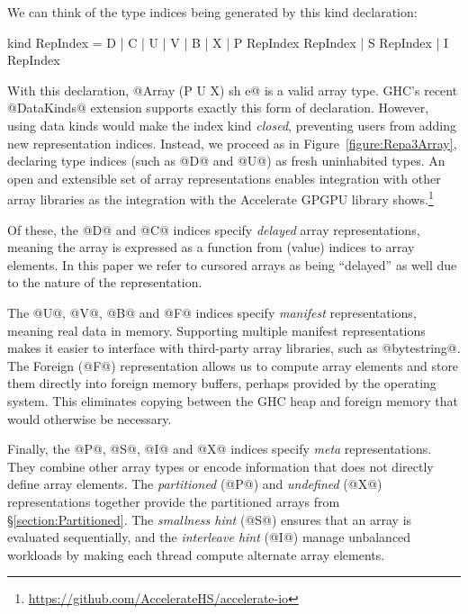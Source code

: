 We can think of the type indices being generated by this kind declaration:
\begin{small}
\begin{code}
  kind RepIndex = D | C | U | V | B | X
                | P RepIndex RepIndex
                | S RepIndex | I RepIndex
\end{code}
\end{small}
With this declaration, @Array (P U X) sh e@ is a valid array type. GHC's recent @DataKinds@ extension supports exactly this form of declaration. However, using data kinds would make the index kind \emph{closed}, preventing users from adding new representation indices. Instead, we proceed as in Figure~\ref{figure:Repa3Array}, declaring type indices (such as @D@ and @U@) as fresh uninhabited types. An open and extensible set of array representations enables integration with other array libraries as the integration with the Accelerate GPGPU library shows.\footnote{\url{https://github.com/AccelerateHS/accelerate-io}}

Of these, the @D@ and @C@ indices specify \emph{delayed} array representations, meaning the array is expressed as a function from (value) indices to array elements. In this paper we refer to cursored arrays as being ``delayed'' as well due to the nature of the representation.

The @U@, @V@, @B@ and @F@ indices specify \emph{manifest} representations, meaning real data in memory. Supporting multiple manifest representations makes it easier to interface with third-party array libraries, such as @bytestring@. The Foreign (@F@) representation allows us to compute array elements and store them directly into foreign memory buffers, perhaps provided by the operating system. This eliminates copying between the GHC heap and foreign memory that would otherwise be necessary.

Finally, the @P@, @S@, @I@ and @X@ indices specify \emph{meta} representations. They combine other array types or encode information that does not directly define array elements. The \emph{partitioned} (@P@) and \emph{undefined} (@X@) representations together provide the partitioned arrays from \S\ref{section:Partitioned}. The \emph{smallness hint} (@S@) ensures that an array is evaluated sequentially, and the \emph{interleave hint} (@I@) manage unbalanced workloads by making each thread compute alternate array elements.


